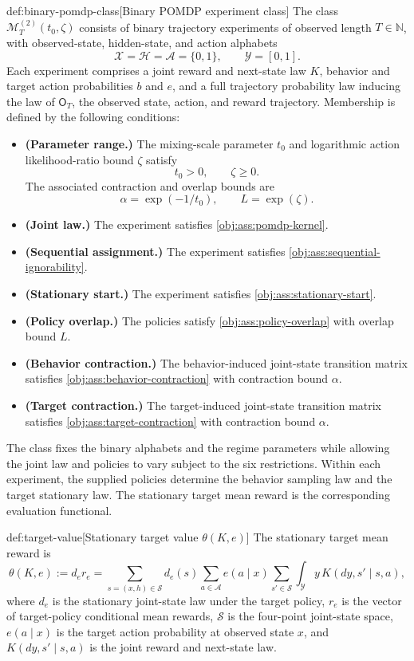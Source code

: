 \documentclass[11pt]{article}
\begin{document}
\begin{definitionv}{def:binary-pomdp-class}[Binary POMDP experiment class]
The class \(\mathcal M_T^{(2)}(t_0,\zeta)\) consists of binary trajectory experiments of observed length \(T\in\mathbb N\), with observed-state, hidden-state, and action alphabets
\[
\mathcal X=\mathcal H=\mathcal A=\{0,1\},
\qquad \mathcal Y=[0,1].
\]
Each experiment comprises a joint reward and next-state law \(K\), behavior and target action probabilities \(b\) and \(e\), and a full trajectory probability law inducing the law of \(\mathsf O_T\), the observed state, action, and reward trajectory. Membership is defined by the following conditions:
\begin{itemize}
\item \textbf{(Parameter range.)} The mixing-scale parameter \(t_0\) and logarithmic action likelihood-ratio bound \(\zeta\) satisfy
\[
t_0>0,\qquad \zeta\ge 0.
\]
The associated contraction and overlap bounds are
\[
\alpha=\exp(-1/t_0),\qquad L=\exp(\zeta).
\]
\item \textbf{(Joint law.)} The experiment satisfies \cref{obj:ass:pomdp-kernel}.
\item \textbf{(Sequential assignment.)} The experiment satisfies \cref{obj:ass:sequential-ignorability}.
\item \textbf{(Stationary start.)} The experiment satisfies \cref{obj:ass:stationary-start}.
\item \textbf{(Policy overlap.)} The policies satisfy \cref{obj:ass:policy-overlap} with overlap bound \(L\).
\item \textbf{(Behavior contraction.)} The behavior-induced joint-state transition matrix satisfies \cref{obj:ass:behavior-contraction} with contraction bound \(\alpha\).
\item \textbf{(Target contraction.)} The target-induced joint-state transition matrix satisfies \cref{obj:ass:target-contraction} with contraction bound \(\alpha\).
\end{itemize}
\end{definitionv}

The class fixes the binary alphabets and the regime parameters while allowing the joint law and policies to vary subject to the six restrictions. Within each experiment, the supplied policies determine the behavior sampling law and the target stationary law. The stationary target mean reward  is the corresponding evaluation functional.

\begin{definitionv}{def:target-value}[Stationary target value $\theta(K,e)$]
The stationary target mean reward is
\[
\theta(K,e)
:=
d_e r_e
=
\sum_{s=(x,h)\in\mathcal S}
d_e(s)
\sum_{a\in\mathcal A}
e(a\mid x)
\sum_{s'\in\mathcal S}
\int_{\mathcal Y}
y\,K(dy,s'\mid s,a),
\]
where \(d_e\) is the stationary joint-state law under the target policy, \(r_e\) is the vector of target-policy conditional mean rewards, \(\mathcal S\) is the four-point joint-state space, \(e(a\mid x)\) is the target action probability at observed state \(x\), and \(K(dy,s'\mid s,a)\) is the joint reward and next-state law.
\end{definitionv}
\end{document}
